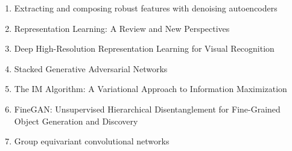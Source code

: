 \documentclass[acmlarge]{acmart}
\begin{document}
\begin{enumerate}
	\item Extracting and composing robust features with denoising autoencoders \cite{vincent2008extracting} 

	\item Representation Learning: A Review and New Perspectives \cite{Bengio2013RepresentationLA} 

	\item Deep High-Resolution Representation Learning for Visual Recognition \cite{Wang2020DeepHR} 

	\item Stacked Generative Adversarial Networks \cite{Huang2017StackedGA} 

	\item The IM Algorithm: A Variational Approach to Information Maximization \cite{Barber2003TheIA} 

	\item FineGAN: Unsupervised Hierarchical Disentanglement for Fine-Grained Object Generation and Discovery \cite{Singh2019FineGANUH} 

	\item Group equivariant convolutional networks \cite{cohen2016group} 

\end{enumerate}
\newpage


\end{document}
